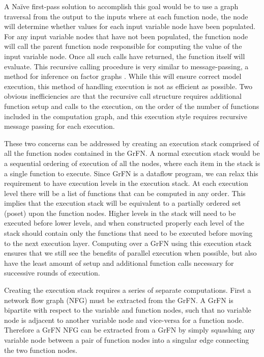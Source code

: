 A Naïve first-pass solution to accomplish this goal would be to use a graph traversal from the output to the inputs where at each function node, the node will determine whether values for each input variable node have been populated.
For any input variable nodes that have not been populated, the function node will call the parent function node responsible for computing the value of the input variable node.
Once all such calls have returned, the function itself will evaluate. This recursive calling procedure is very similar to message-passing, a method for inference on factor graphs \citep{bishop2006pattern}.
While this will ensure correct model execution, this method of handling execution is not as efficient as possible.
Two obvious inefficiencies are that the recursive call structure requires additional function setup and calls to the execution, on the order of the number of functions included in the computation graph, and this execution style requires recursive message passing for each execution.

These two concerns can be addressed by creating an execution stack comprised of all the function nodes contained in the GrFN.
A normal execution stack would be a sequential ordering of execution of all the nodes, where each item in the stack is a single function to execute.
Since GrFN is a dataflow program, we can relax this requirement to have execution levels in the execution stack.
At each execution level there will be a list of functions that can be computed in any order.
This implies that the execution stack will be equivalent to a partially ordered set (poset) \citep{simovici2008miningTools} upon the function nodes.
Higher levels in the stack will need to be executed before lower levels, and when constructed properly each level of the stack should contain only the functions that need to be executed before moving to the next execution layer.
Computing over a GrFN using this execution stack ensures that we still see the benefits of parallel execution when possible, but also have the least amount of setup and additional function calls necessary for successive rounds of execution.

Creating the execution stack requires a series of separate computations.
First a network flow graph (NFG) \citep{allen1970CFG} must be extracted from the GrFN.
A GrFN is bipartite \citep{bondy1976graph} with respect to the variable and function nodes, such that no variable node is adjacent to another variable node and vice-versa for a function node.
Therefore a GrFN NFG can be extracted from a GrFN by simply squashing any variable node between a pair of function nodes into a singular edge connecting the two function nodes.

